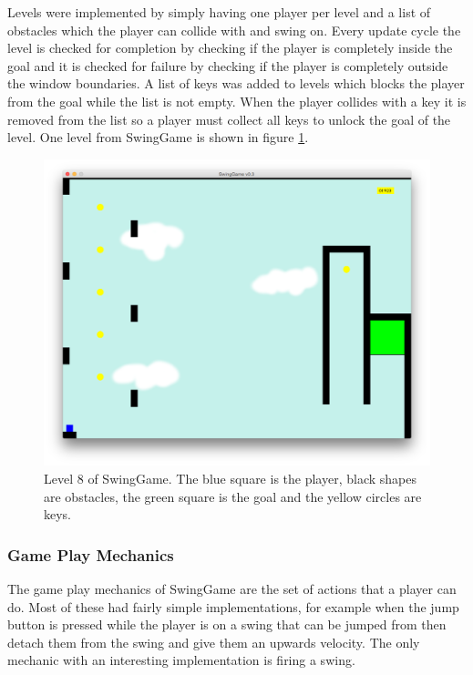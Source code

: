 \documentclass[]{report}
\begin{document}
			Levels were implemented by simply having one player per level and a list of obstacles which the player can collide with and swing on. Every update cycle the level is checked for completion by checking if the player is completely inside the goal and it is checked for failure by checking if the player is completely outside the window boundaries. A list of keys was added to levels which blocks the player from the goal while the list is not empty. When the player collides with a key it is removed from the list so a player must collect all keys to unlock the goal of the level. One level from SwingGame is shown in figure \ref{level8}.
			
			\begin{figure}[H]
				\centering
				\includegraphics[scale=0.25]{level8}
				\caption{Level 8 of SwingGame. The blue square is the player, black shapes are obstacles, the green square is the goal and the yellow circles are keys.}
				\label{level8}
			\end{figure}
			\subsubsection{Game Play Mechanics}
			The game play mechanics of SwingGame are the set of actions that a player can do. Most of these had fairly simple implementations, for example when the jump button is pressed while the player is on a swing that can be jumped from then detach them from the swing and give them an upwards velocity. The only mechanic with an interesting implementation is firing a swing.
			
\end{document}
